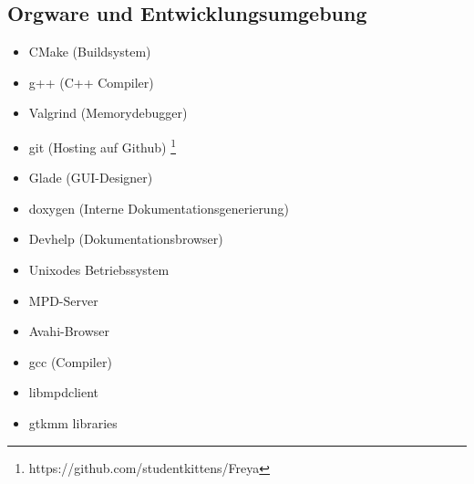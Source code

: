 \subsection{Orgware und Entwicklungsumgebung}
\begin{itemize}
	\item CMake (Buildsystem)
	\item g++ (C++ Compiler)
	\item Valgrind (Memorydebugger)
	\item git (Hosting auf Github) \footnote{https://github.com/studentkittens/Freya}
	\item Glade (GUI-Designer)
	\item doxygen  (Interne Dokumentationsgenerierung)
	\item Devhelp (Dokumentationsbrowser)
	\item Unixodes Betriebssystem
    	\item MPD-Server	
    	\item Avahi-Browser
    	\item gcc (Compiler)
    	\item libmpdclient
    	\item gtkmm libraries
\end{itemize}
